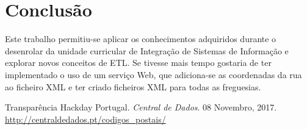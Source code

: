 \documentclass[11pt]{report}
\begin{document}
\clearpage





\chapter*{Conclusão}

Este trabalho permitiu-se aplicar os conhecimentos adquiridos durante o desenrolar da unidade curricular de Integração de Sistemas de Informação e explorar novos conceitos de ETL. Se tivesse mais tempo gostaria de ter implementado o uso de um serviço Web, que adiciona-se as coordenadas da rua ao ficheiro XML e ter criado ficheiros XML para todas as freguesias.

\begin{thebibliography}{2}
	Transparência Hackday Portugal. \emph{Central de Dados}.  08 Novembro, 2017. 
	\url{http://centraldedados.pt/codigos_postais/}
	

\end{thebibliography}
\end{document}
